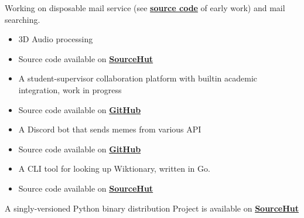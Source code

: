 
Working on disposable mail service (see \textbf{\href{https://github.com/Huy-Ngo/temp-mail} {source code}} of early work) and mail searching.


\begin{itemize}
\item 3D Audio processing
\item Source code available on \textbf{\href{https://sr.ht/~cnx/palace}{SourceHut}}
\end{itemize}

\divider

\begin{itemize}
\item A student-supervisor collaboration platform with builtin academic integration, work in progress
\item Source code available on \textbf{\href{https://github.com/Huy-Ngo/acanban}{GitHub}}
\end{itemize}

\divider

\begin{itemize}
\item A Discord bot that sends memes from various API
\item Source code available on \textbf{\href{https://github.com/Huy-Ngo/discord-meme-bot}{GitHub}}
\end{itemize}

\divider

\begin{itemize}
\item A CLI tool for looking up Wiktionary, written in Go.
\item Source code available on \textbf{\href{https://sr.ht/~huyngo/wikt-cli}{SourceHut}}
\end{itemize}

\divider

A singly-versioned Python binary distribution Project is available on \textbf{\href{https://sr.ht/~cnx/ipwhl}{SourceHut}}

